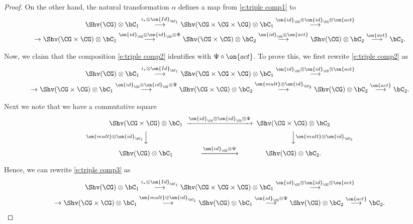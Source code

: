 \documentclass[9pt]{amsart}
\theoremstyle{definition}
\theoremstyle{remark}
\numberwithin{equation}{section}
\begin{document}
\begin{proof}
\medskip

On the other hand, the natural transformation $\alpha$ defines a map from \eqref{e:triple comp1} to
\begin{multline}  \label{e:triple comp2}
\Shv(\CG)\otimes \bC_1 \overset{i_*\otimes \on{Id}_{\bC_1}}\longrightarrow \Shv(\CG\times\CG\times \CG)\otimes \bC_1
\overset{\on{id}_\CG\otimes \on{id}_\CG \otimes \on{act}} \longrightarrow \\
\to \Shv(\CG\times \CG)\otimes \bC_1 \overset{\on{id}_\CG\otimes \on{id}_\CG\otimes \Psi}\longrightarrow 
\Shv(\CG\times \CG)\otimes \bC_2 \overset{\on{id}_\CG\otimes \on{act}} \longrightarrow 
 \Shv(\CG)\otimes \bC_2 \overset{\on{act}}\longrightarrow \bC_2.
\end{multline}  

Now, we claim that the composition \eqref{e:triple comp2} identifies with $\Psi\circ \on{act}$. To prove this, we first rewrite 
\eqref{e:triple comp2} as 
\begin{multline}   \label{e:triple comp3}
\Shv(\CG)\otimes \bC_1 \overset{i_*\otimes \on{Id}_{\bC_1}}\longrightarrow \Shv(\CG\times\CG\times \CG)\otimes \bC_1
\overset{\on{id}_\CG\otimes \on{id}_\CG \otimes \on{act}} \longrightarrow \\
\to \Shv(\CG\times \CG)\otimes \bC_1 \overset{\on{id}_\CG\otimes \on{id}_\CG\otimes \Psi}\longrightarrow 
\Shv(\CG\times \CG)\otimes \bC_2 \overset{\on{mult}\otimes \on{id}_{\bC_2}} \longrightarrow 
 \Shv(\CG)\otimes \bC_2 \overset{\on{act}}\longrightarrow \bC_2.
\end{multline}  

Next we note that we have a commutative square
\begin{equation} \label{e:crucial square}
\CD
\Shv(\CG\times \CG)\otimes \bC_1  @>{\on{id}_\CG\otimes \on{id}_\CG\otimes \Psi}>>  \Shv(\CG\times \CG)\otimes \bC_2  \\
@V{\on{mult}\otimes \on{id}_{\bC_1}}VV  @VV{\on{mult}\otimes \on{id}_{\bC_2}}V  \\
\Shv(\CG)\otimes \bC_1 @>{\on{id}_\CG\otimes \Psi}>>   \Shv(\CG)\otimes \bC_2.
\endCD
\end{equation}

Hence, we can rewrite \eqref{e:triple comp3} as
\begin{multline}   \label{e:triple comp4}
\Shv(\CG)\otimes \bC_1 \overset{i_*\otimes \on{Id}_{\bC_1}}\longrightarrow \Shv(\CG\times\CG\times \CG)\otimes \bC_1
\overset{\on{id}_\CG\otimes \on{id}_\CG \otimes \on{act}} \longrightarrow \\
\to \Shv(\CG\times \CG)\otimes \bC_1 \overset{{\on{mult}\otimes \on{id}_{\bC_1}}}\longrightarrow \Shv(\CG)\otimes \bC_1 
\overset{\on{id}_\CG\otimes \Psi}\longrightarrow \Shv(\CG)\otimes \bC_2 \overset{\on{act}}\longrightarrow \bC_2.
\end{multline} 


\end{proof}
\end{document}
